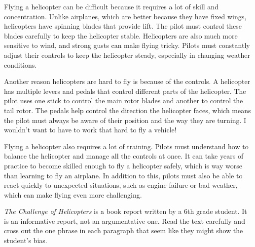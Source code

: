 \documentclass[12pt]{article}
\begin{document}
\begin{tcolorbox}[colframe=black!60, colback=white, 
coltitle=black, colbacktitle=black!15, fonttitle=\bfseries\Large, 
title=Text: The Challenge of Helicopters, halign title=center, left=10pt, right=10pt, top=10pt, bottom=15pt]
Flying a helicopter can be difficult because it requires a lot of skill and concentration. Unlike airplanes, which are better because they have fixed wings, helicopters have spinning blades that provide lift. The pilot must control these blades carefully to keep the helicopter stable. Helicopters are also much more sensitive to wind, and strong gusts can make flying tricky. Pilots must constantly adjust their controls to keep the helicopter steady, especially in changing weather conditions.

Another reason helicopters are hard to fly is because of the controls. A helicopter has multiple levers and pedals that control different parts of the helicopter. The pilot uses one stick to control the main rotor blades and another to control the tail rotor. The pedals help control the direction the helicopter faces, which means the pilot must always be aware of their position and the way they are turning. I wouldn't want to have to work that hard to fly a vehicle!

Flying a helicopter also requires a lot of training. Pilots must understand how to balance the helicopter and manage all the controls at once. It can take years of practice to become skilled enough to fly a helicopter safely, which is way worse than learning to fly an airplane. In addition to this, pilots must also be able to react quickly to unexpected situations, such as engine failure or bad weather, which can make flying even more challenging.

 
\end{tcolorbox}
\begin{tcolorbox}[colframe=black!60, colback=white, 
coltitle=black, colbacktitle=black!15, fonttitle=\bfseries\Large, 
title=Guided Practice, halign title=center, left=10pt, right=10pt, top=10pt, bottom=15pt]

\vspace{0.5cm}


\textit{The Challenge of Helicopters} is a book report written by a 6th grade student. It is an informative report, not an argumentative one. Read the text carefully and cross out the one phrase in each paragraph that seem like they might show the student's bias.

 

      


\end{tcolorbox}
\end{document}
